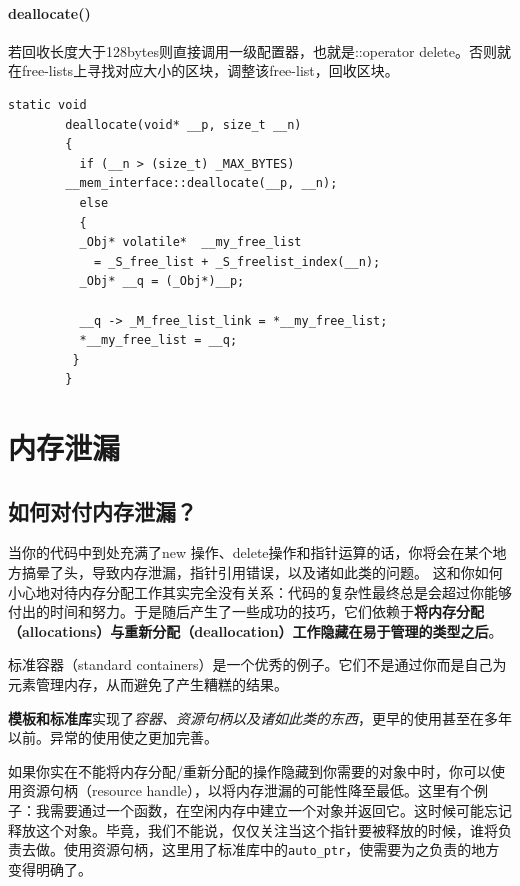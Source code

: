 \documentclass[UTF8,a4paper,12pt]{ctexbook}
\begin{document}
		\paragraph{deallocate()}
			若回收长度大于128bytes则直接调用一级配置器，也就是::operator delete。否则就在free-lists上寻找对应大小的区块，调整该free-list，回收区块。
				
			\begin{lstlisting}[frame = lines]
	static void   
	    deallocate(void* __p, size_t __n)  
	    {  
	      if (__n > (size_t) _MAX_BYTES)  
	    __mem_interface::deallocate(__p, __n);  
	      else   
	      {  
	      _Obj* volatile*  __my_free_list  
	        = _S_free_list + _S_freelist_index(__n);  
	      _Obj* __q = (_Obj*)__p;  
	        
	      __q -> _M_free_list_link = *__my_free_list;  
	      *__my_free_list = __q;  
	     }  
	    }  
			\end{lstlisting}
					
	\section{内存泄漏}
		\subsection{如何对付内存泄漏？}
			当你的代码中到处充满了new 操作、delete操作和指针运算的话，你将会在某个地方搞晕了头，导致内存泄漏，指针引用错误，以及诸如此类的问题。
			这和你如何小心地对待内存分配工作其实完全没有关系：代码的复杂性最终总是会超过你能够付出的时间和努力。于是随后产生了一些成功的技巧，它们依赖于\textbf{将内存分配（allocations）与重新分配（deallocation）工作隐藏在易于管理的类型之后}。
			
			标准容器（standard containers）是一个优秀的例子。它们不是通过你而是自己为元素管理内存，从而避免了产生糟糕的结果。
			
			\textbf{模板和标准库}实现了\textit{容器、资源句柄以及诸如此类的东西}，更早的使用甚至在多年以前。异常的使用使之更加完善。
			
			如果你实在不能将内存分配/重新分配的操作隐藏到你需要的对象中时，你可以使用资源句柄（resource handle），以将内存泄漏的可能性降至最低。这里有个例子：我需要通过一个函数，在空闲内存中建立一个对象并返回它。这时候可能忘记释放这个对象。毕竟，我们不能说，仅仅关注当这个指针要被释放的时候，谁将负责去做。使用资源句柄，这里用了标准库中的\verb|auto_ptr|，使需要为之负责的地方变得明确了。
			
\end{document}
